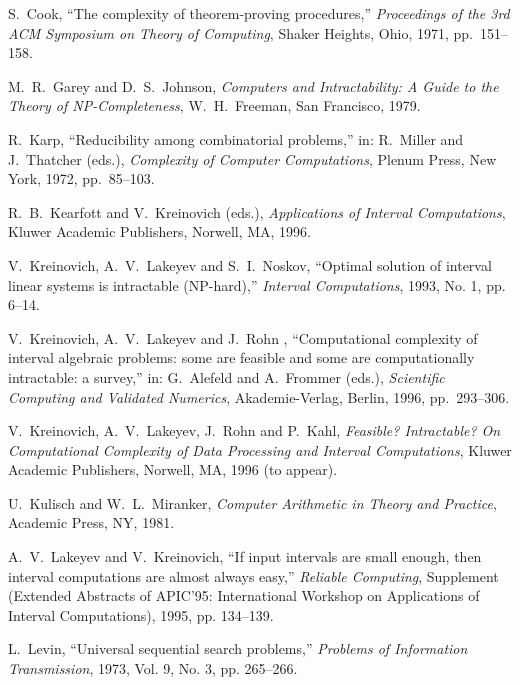 
\begin{thereferences}{99}

S.~Cook,
 ``The complexity of theorem-proving procedures,''
 {\it Proceedings of the 3rd ACM Symposium on Theory of Computing},
 Shaker Heights, Ohio, 1971, pp.~151--158.

M.~R.~Garey and D.~S.~Johnson,
 {\it Computers and Intractability: A Guide to the Theory of\/
 {\rm NP}-Completeness},
 W.~H.~Freeman, San Francisco, 1979.

R.~Karp,
 ``Reducibility among combinatorial problems,''
 in: R.~Miller and J.~Thatcher (eds.),
 {\it Complexity of Computer Computations},
 Plenum Press, New York, 1972, pp.~85--103.

R.~B.~Kearfott and V.~Kreinovich (eds.),
 {\it Applications of Interval Computations},
 Kluwer Academic Publishers, Norwell, MA, 1996.

V.~Kreinovich, A.~V.~Lakeyev and S.~I.~Noskov,
 ``Optimal solution of interval linear systems is intractable (NP-hard),''
 {\it Interval Computations},
 1993, No. 1, pp. 6--14.

 V.~Kreinovich, A.~V.~Lakeyev and J.~Rohn ,
 ``Computational complexity of interval algebraic problems: some are feasible
 and some are computationally intractable: a survey,''
 in: G.~Alefeld and A.~Frommer (eds.),
 {\it Scientific Computing and Validated Numerics},
 Akademie-Verlag, Berlin, 1996, pp.~293--306.

 V.~Kreinovich, A.~V.~Lakeyev, J.~Rohn and P.~Kahl,
 {\it Feasible? Intractable? On Computational Complexity of Data Processing
 and Interval Computations},
 Kluwer Academic Publishers, Norwell, MA, 1996 (to appear).

U.~Kulisch and W.~L.~Miranker,
 {\it Computer Arithmetic in Theory and Practice},
 Academic Press, NY, 1981.

A.~V.~Lakeyev and V.~Kreinovich,
 ``If input intervals are small enough, then interval computations are almost
 always easy,''
 {\it Reliable Computing},
 Supplement (Extended Abstracts of APIC'95: International Workshop on 
 Applications of Interval Computations),
 1995, pp. 134--139.

L.~Levin,
 ``Universal sequential search problems,''
 {\it Problems of Information Transmission},
 1973, Vol. 9, No. 3, pp. 265--266.


\end{thereferences}
